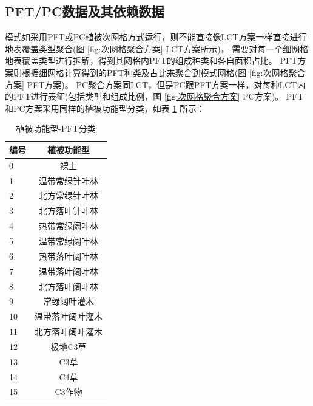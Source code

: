 \subsection{PFT/PC数据及其依赖数据}\label{PFTPC数据及其依赖数据}
模式如采用PFT或PC植被次网格方式运行，则不能直接像LCT方案一样直接进行地表覆盖类型聚合(图 \ref{fig:次网格聚合方案} LCT方案所示)，
需要对每一个细网格地表覆盖类型进行拆解，得到其网格内PFT的组成种类和各自面积占比。
PFT方案则根据细网格计算得到的PFT种类及占比来聚合到模式网格(图 \ref{fig:次网格聚合方案} PFT方案)。
PC聚合方案同LCT，但是PC跟PFT方案一样，对每种LCT内的PFT进行表征(包括类型和组成比例，图 \ref{fig:次网格聚合方案} PC方案)。
PFT和PC方案采用同样的植被功能型分类，如表 \ref{tab:PFT分类} 所示：

\begin{table}[]
\centering
\caption{植被功能型-PFT分类}
\label{tab:PFT分类}
\begin{tabular}{@{}lc@{}}
\toprule
\multicolumn{1}{c}{编号} & \multicolumn{1}{c}{植被功能型} \\ \midrule
0                      & 裸土                        \\
1                      & 温带常绿针叶林                   \\
2                      & 北方常绿针叶林                   \\
3                      & 北方落叶针叶林                   \\
4                      & 热带常绿阔叶林                   \\
5                      & 温带常绿阔叶林                   \\
6                      & 热带落叶阔叶林                   \\
7                      & 温带落叶阔叶林                   \\
8                      & 北方落叶阔叶林                   \\
9                      & 常绿阔叶灌木                    \\
10                     & 温带落叶阔叶灌木                  \\
11                     & 北方落叶阔叶灌木                  \\
12                     & 极地C3草                     \\
13                     & C3草                       \\
14                     & C4草                       \\
15                     & C3作物                      \\ \bottomrule
\end{tabular}
\end{table}


